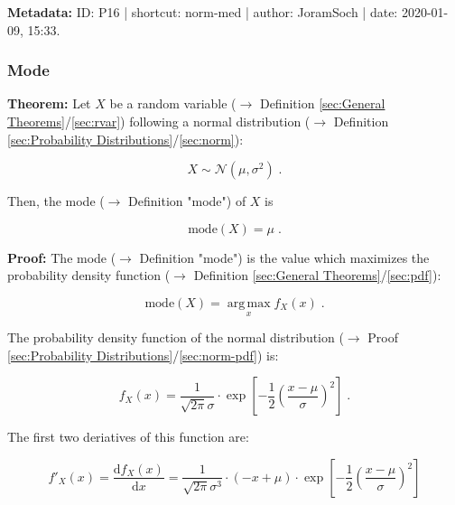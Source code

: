 \documentclass[a4paper,12pt,twoside]{book}
\begin{document}
\vspace{1em}
\textbf{Metadata:} ID: P16 | shortcut: norm-med | author: JoramSoch | date: 2020-01-09, 15:33.
\vspace{1em}



\subsubsection[\textbf{Mode}]{Mode} \label{sec:norm-mode}
\setcounter{equation}{0}

\textbf{Theorem:} Let $X$ be a random variable ($\rightarrow$ Definition \ref{sec:General Theorems}/\ref{sec:rvar}) following a normal distribution ($\rightarrow$ Definition \ref{sec:Probability Distributions}/\ref{sec:norm}):

\begin{equation} \label{eq:norm-mode-norm}
X \sim \mathcal{N}(\mu, \sigma^2) \; .
\end{equation}

Then, the mode ($\rightarrow$ Definition "mode") of $X$ is

\begin{equation} \label{eq:norm-mode-norm-mode}
\mathrm{mode}(X) = \mu \; .
\end{equation}


\vspace{1em}
\textbf{Proof:} The mode ($\rightarrow$ Definition "mode") is the value which maximizes the probability density function ($\rightarrow$ Definition \ref{sec:General Theorems}/\ref{sec:pdf}):

\begin{equation} \label{eq:norm-mode-mode}
\mathrm{mode}(X) = \operatorname*{arg\,max}_x f_X(x) \; .
\end{equation}

The probability density function of the normal distribution ($\rightarrow$ Proof \ref{sec:Probability Distributions}/\ref{sec:norm-pdf}) is:

\begin{equation} \label{eq:norm-mode-norm-pdf}
f_X(x) = \frac{1}{\sqrt{2 \pi} \sigma} \cdot \exp \left[ -\frac{1}{2} \left( \frac{x-\mu}{\sigma} \right)^2 \right] \; .
\end{equation}

The first two deriatives of this function are:

\begin{equation} \label{eq:norm-mode-norm-pdf-der1}
f'_X(x) = \frac{\mathrm{d}f_X(x)}{\mathrm{d}x} = \frac{1}{\sqrt{2 \pi} \sigma^3} \cdot (-x + \mu) \cdot \exp \left[ -\frac{1}{2} \left( \frac{x-\mu}{\sigma} \right)^2 \right]
\end{equation}
\end{document}
